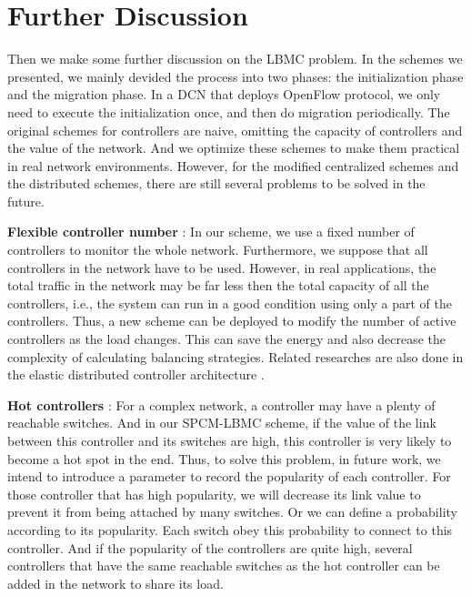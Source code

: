 

\chapter{Further Discussion}
\label{chap:discuss}

Then we make some further discussion on the LBMC problem. In the schemes we presented, we mainly devided the process into two phases: the initialization phase and the migration phase. In a DCN that deploys OpenFlow protocol, we only need to execute the initialization once, and then do migration periodically. The original schemes for controllers are naive, omitting the capacity of controllers and the value of the network. And we optimize these schemes to make them practical in real network environments. However, for the modified centralized schemes and the distributed schemes, there are still several problems to be solved in the future.

\textbf{Flexible controller number} : In our scheme, we use a fixed number of controllers to monitor the whole network. Furthermore, we suppose that all controllers in the network have to be used. However, in real applications, the total traffic in the network may be far less then the total capacity of all the controllers, i.e., the system can run in a good condition using only a part of the controllers. Thus, a new scheme can be deployed to modify the number of active controllers as the load changes. This can save the energy and also decrease the complexity of calculating balancing strategies. Related researches are also done in the elastic distributed controller architecture \cite{elasticsdn}.

\textbf{Hot controllers} : For a complex network, a controller may have a plenty of reachable switches. And in our SPCM-LBMC scheme, if the value of the link between this controller and its switches are high, this controller is very likely to become a hot spot in the end. Thus, to solve this problem, in future work, we intend to introduce a parameter to record the popularity of each controller. For those controller that has high popularity, we will decrease its link value to prevent it from being attached by many switches. Or we can define a probability according to  its popularity. Each switch obey this probability to connect to this controller. And if the popularity of the controllers are quite high, several controllers that have the same reachable switches as the hot controller can be added in the network to share its load.

